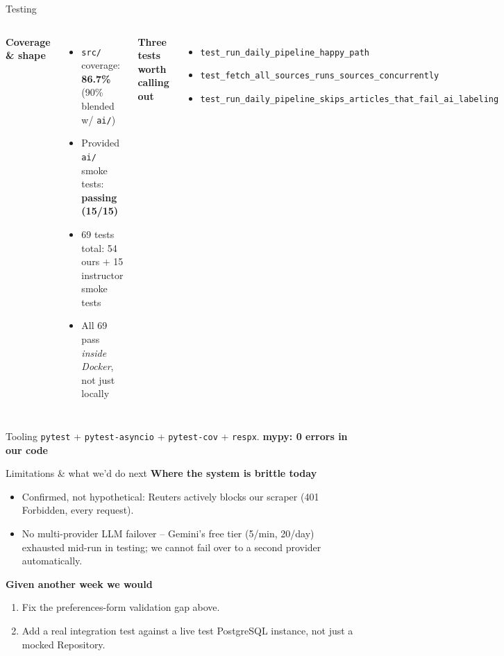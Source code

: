 \documentclass[aspectratio=169,11pt]{beamer}
\begin{document}
\begin{frame}{Testing}
  \begin{columns}[T,onlytextwidth]
  \textbf{Coverage \& shape}
  \begin{itemize}\setlength\itemsep{0.3em}
    \item \texttt{src/} coverage: \textbf{86.7\%} (90\% blended w/ \texttt{ai/})
    \item Provided \texttt{ai/} smoke tests: \textcolor{ok}{\textbf{passing (15/15)}}
    \item 69 tests total: 54 ours + 15 instructor smoke tests
    \item All 69 pass \emph{inside Docker}, not just locally
  \end{itemize}

  \textbf{Three tests worth calling out}
  \begin{itemize}\setlength\itemsep{0.3em}
    \item \texttt{test\_run\_daily\_pipeline\_happy\_path}
    \item \texttt{test\_fetch\_all\_sources\_runs\_sources\_concurrently}
    \item \texttt{test\_run\_daily\_pipeline\_skips\_articles\_that\_fail\_ai\_labeling}
  \end{itemize}
  \end{columns}

  \vspace{0.6em}
  \begin{block}{Tooling}
    \texttt{pytest} + \texttt{pytest-asyncio} + \texttt{pytest-cov} + \texttt{respx}. \textbf{mypy: 0 errors in our code}
  \end{block}
\end{frame}

\begin{frame}{Limitations \& what we'd do next}
  \textbf{Where the system is brittle today}
  \begin{itemize}\setlength\itemsep{0.3em}
    \item Confirmed, not hypothetical: Reuters actively blocks our scraper (401 Forbidden, every request).
    \item No multi-provider LLM failover -- Gemini's free tier (5/min, 20/day) exhausted mid-run in testing; we cannot fail over to a second provider automatically.
  \end{itemize}

  \vspace{0.4em}
  \textbf{Given another week we would}
  \begin{enumerate}\setlength\itemsep{0.3em}
    \item Fix the preferences-form validation gap above.
    \item Add a real integration test against a live test PostgreSQL instance, not just a mocked Repository.
  \end{enumerate}
\end{frame}
\end{document}
